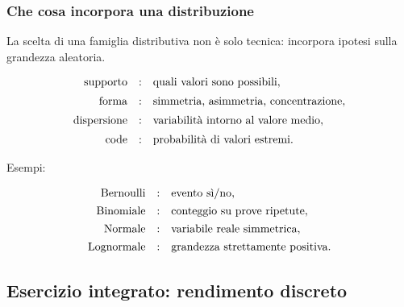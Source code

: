 \documentclass[handout]{beamer}%
\providecommand{\1}{\mathbf{1}}
\providecommand{\QTR}[2]{\csname #1\endcsname{#2}}
\begin{document}
\begin{frame}%
%

\frametitle{Che cosa incorpora una distribuzione}%


La scelta di una famiglia distributiva non \`{e} solo tecnica: incorpora
ipotesi sulla grandezza aleatoria.

\medskip%

\[%
\begin{array}
[c]{rcl}%
\mbox{supporto} & : & \mbox{quali valori sono possibili},\\[5pt]%
\mbox{forma} & : & \mbox{simmetria, asimmetria, concentrazione},\\[5pt]%
\mbox{dispersione} & : &
\mbox{variabilit\`{a} intorno al valore medio},\\[5pt]%
\mbox{code} & : & \mbox{probabilit\`{a} di valori estremi}.
\end{array}
\]


\medskip

Esempi:%

\[%
\begin{array}
[c]{rcl}%
\mbox{Bernoulli} & : & \mbox{evento s\`{i}/no},\\[4pt]%
\mbox{Binomiale} & : & \mbox{conteggio su prove ripetute},\\[4pt]%
\mbox{Normale} & : & \mbox{variabile reale simmetrica},\\[4pt]%
\mbox{Lognormale} & : & \mbox{grandezza strettamente positiva}.
\end{array}
\]
%

\transboxout
\end{frame}%




\subsection{Esercizio integrato: rendimento discreto}%
\end{document}
